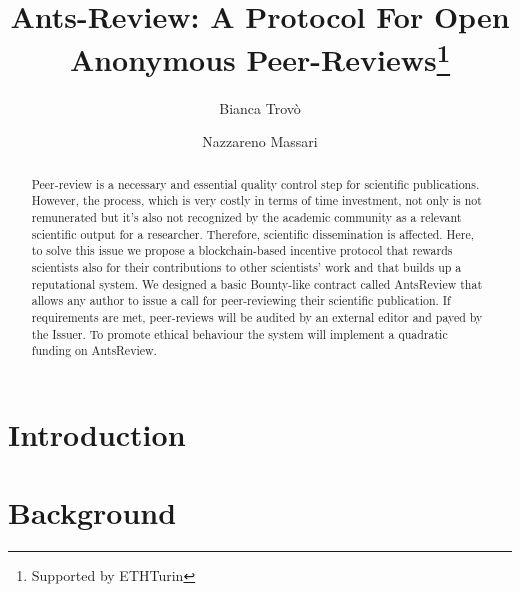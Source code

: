 \documentclass[runningheads]{llncs}
\begin{document}
%
\title{Ants-Review: A Protocol For Open Anonymous Peer-Reviews\thanks{Supported by ETHTurin}}
%
%
\author{Bianca Trovò \and
Nazzareno Massari}
%
%
%
\maketitle              %
%
\begin{abstract}
Peer-review is a necessary and essential quality control step for scientific publications. However, the process, which is very costly in terms of time investment, not only is not remunerated but it’s also not recognized by the academic community as a relevant scientific output for a researcher. Therefore, scientific dissemination is affected. Here, to solve this issue we propose a blockchain-based incentive protocol that rewards scientists also for their contributions to other scientists’ work and that builds up a reputational system. We designed a basic Bounty-like contract called AntsReview that allows any author to issue a call for peer-reviewing their scientific publication. If requirements are met, peer-reviews will be audited by an external editor and payed by the Issuer. To promote ethical behaviour the system will implement a quadratic funding on AntsReview.
\end{abstract}
%
%
\section{Introduction}

\section{Background}
\end{document}
